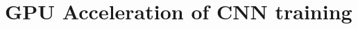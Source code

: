 \documentclass[Main]{subfiles}
\begin{document}
\section{GPU Acceleration of CNN training} %
	\label{sec:gpu_acceleration_of_cnn_training}




\end{document}
